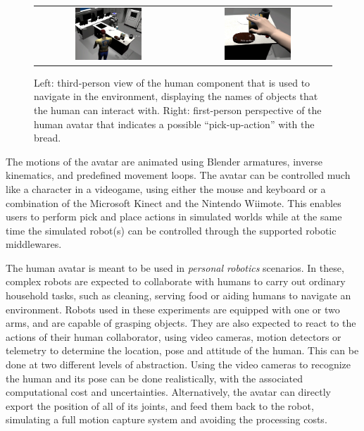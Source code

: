 \documentclass{llncs}
\begin{document}
\begin{figure}[ht!]
\centering
\begin{tabular}{cc}
 \includegraphics[width=0.475\textwidth]{pics/human_control_1.png} &
 \includegraphics[width=0.475\textwidth]{pics/human_control_2.png}
\end{tabular}
\caption{Left: third-person view of the human component that is used to
    navigate in the environment, displaying the names of objects that the human
    can interact with. Right: first-person perspective of the human avatar that
    indicates a possible ``pick-up-action'' with the bread.}
\label{fig:human_control}
\end{figure}

The motions of the avatar are animated using Blender %
armatures, inverse kinematics, and predefined movement loops.
The avatar can be controlled much like a character in a videogame, using either
the mouse and keyboard or a combination of the Microsoft Kinect and the
Nintendo Wiimote. This enables users to perform
pick and place actions in simulated worlds while at the same time the
simulated robot(s) can be controlled through the supported robotic middlewares.


The human avatar is meant to be used in \emph{personal robotics} scenarios.
In these, complex robots are expected to collaborate with humans to carry out
ordinary household tasks, such as cleaning, serving food or aiding humans to
navigate an environment.
Robots used in these experiments are equipped with one or two arms, and are
capable of grasping objects. They are also expected to react to the actions of
their human collaborator, using video cameras, motion detectors or telemetry to
determine the location, pose and attitude of the human.
This can be done at two different levels of
abstraction. Using the video cameras to recognize the human and its pose can be
done realistically, with the associated computational cost and uncertainties.
Alternatively, the avatar can directly export the position of all of its
joints, and feed them back to the robot, simulating a full motion capture
system and avoiding the processing costs.
\end{document}
